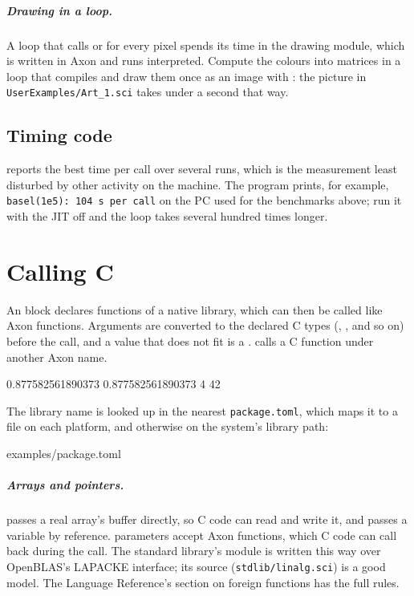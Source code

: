 \documentclass[11pt,a4paper,openany]{report}
\begin{document}
{{\paragraph{Drawing in a loop.} A loop that calls  or
 for every pixel spends its time in the drawing module,
which is written in Axon and runs interpreted. Compute the colours into
matrices in a loop that compiles and draw them once as an image with
: the picture in \texttt{UserExamples/Art\_1.sci} takes
under a second that way.

\section{Timing code}\label{sec:bench}


 reports the best time per call over several runs, which is
the measurement least disturbed by other activity on the machine. The program
prints, for example, \texttt{basel(1e5): 104 \textmu s per call} on the PC
used for the benchmarks above; run it with the JIT off and the loop takes
several hundred times longer.

\chapter{Calling C}\label{ch:c}

An  block declares functions of a native library, which can then be
called like Axon functions. Arguments are converted to the declared C types
(, ,  and so on) before the call, and a
value that does not fit is a .  calls a C
function under another Axon name.

\begin{axonout}
0.877582561890373 0.877582561890373
4
42
\end{axonout}

The library name is looked up in the nearest \texttt{package.toml}, which maps it
to a file on each platform, and otherwise on the system's library path:


  {examples/package.toml}

\paragraph{Arrays and pointers.}  passes a real array's buffer
directly, so C code can read and write it, and  passes a variable
by reference.  parameters accept Axon functions, which C
code can call back during the call. The standard library's  module
is written this way over OpenBLAS's LAPACKE interface; its source
(\texttt{stdlib/linalg.sci}) is a good model. The Language Reference's section
on foreign functions has the full rules.

}}
\end{document}

